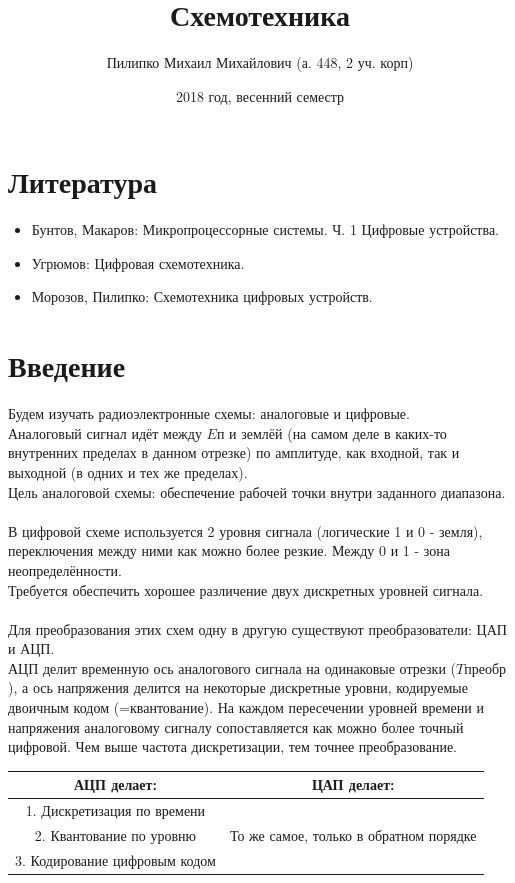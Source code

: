 \documentclass[a4paper,12pt]{report}
\author{Пилипко Михаил Михайлович (а. 448, 2 уч. корп)}
\title{Схемотехника}
\date{2018 год, весенний семестр}
\begin{document}
\makeatletter
{}
\makeatother  

\maketitle
\newpage
\setcounter{section}{-1}
\section{Литература}
\begin{itemize}
\item Бунтов, Макаров: Микропроцессорные системы. Ч. 1 Цифровые устройства.
\item Угрюмов: Цифровая схемотехника.
\item Морозов, Пилипко: Схемотехника цифровых устройств.
\end{itemize}

\section{Введение}
Будем изучать радиоэлектронные схемы: аналоговые и цифровые.\\
Аналоговый сигнал идёт между $Eп$ и землёй (на самом деле в каких-то внутренних пределах в данном отрезке) по амплитуде, как входной, так и выходной (в одних и тех же пределах).\\
Цель аналоговой схемы: обеспечение рабочей точки внутри заданного диапазона.\\
\\
В цифровой схеме используется 2 уровня сигнала (логические 1 и 0 - земля), переключения между ними как можно более резкие. Между 0 и 1 - зона неопределённости.\\
Требуется обеспечить хорошее различение двух дискретных уровней сигнала.\\
\\
Для преобразования этих схем одну в другую существуют преобразователи: ЦАП и АЦП.\\
АЦП делит временную ось аналогового сигнала на одинаковые отрезки ($Tпреобр$), а ось напряжения делится на некоторые дискретные уровни, кодируемые двоичным кодом (=квантование). На каждом пересечении уровней времени и напряжения аналоговому сигналу сопоставляется как можно более точный цифровой. Чем выше частота дискретизации, тем точнее преобразование. \\
\begin{center}
\begin{tabular}{c | c}
АЦП делает: & ЦАП делает: \\ \hline
1. Дискретизация по времени& \\
2. Квантование по уровню & То же самое, только в обратном порядке\\
3. Кодирование цифровым кодом & \\
\end{tabular}
\end{center}
\end{document}
